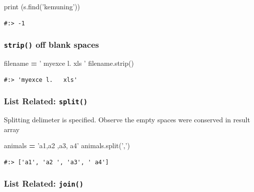 \documentclass[
]{book}
\newenvironment{Shaded}{\begin{snugshade}}{\end{snugshade}}
\newcommand{\BuiltInTok}[1]{#1}
\newcommand{\NormalTok}[1]{#1}
\newcommand{\OperatorTok}[1]{\textcolor[rgb]{0.43,0.43,0.43}{\textbf{#1}}}
\newcommand{\StringTok}[1]{\textcolor[rgb]{0.5,0.5,0.5}{#1}}
\begin{document}
\begin{Shaded}
\begin{Highlighting}[]
\BuiltInTok{print}\NormalTok{ (s.find(}\StringTok{'kemuning'}\NormalTok{))}
\end{Highlighting}
\end{Shaded}

\begin{verbatim}
#:> -1
\end{verbatim}

\hypertarget{strip-off-blank-spaces}{%
\subsubsection{\texorpdfstring{\texttt{strip()} off blank spaces}{strip() off blank spaces}}\label{strip-off-blank-spaces}}

\begin{Shaded}
\begin{Highlighting}[]
\NormalTok{filename }\OperatorTok{=} \StringTok{'  myexce l.   xls   '}
\NormalTok{filename.strip()}
\end{Highlighting}
\end{Shaded}

\begin{verbatim}
#:> 'myexce l.   xls'
\end{verbatim}

\hypertarget{list-related-split}{%
\subsubsection{\texorpdfstring{List Related: \texttt{split()}}{List Related: split()}}\label{list-related-split}}

Splitting delimeter is specified. Observe the empty spaces were conserved in result array

\begin{Shaded}
\begin{Highlighting}[]
\NormalTok{animals }\OperatorTok{=} \StringTok{'a1,a2 ,a3, a4'}
\NormalTok{animals.split(}\StringTok{','}\NormalTok{)}
\end{Highlighting}
\end{Shaded}

\begin{verbatim}
#:> ['a1', 'a2 ', 'a3', ' a4']
\end{verbatim}

\hypertarget{list-related-join}{%
\subsubsection{\texorpdfstring{List Related: \texttt{join()}}{List Related: join()}}\label{list-related-join}}
\end{document}

